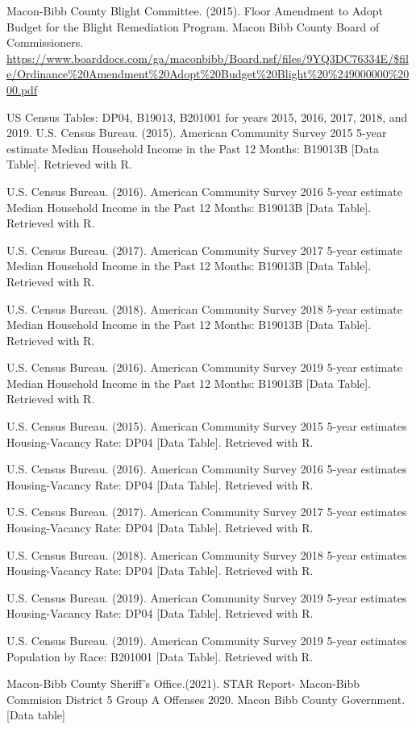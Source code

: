\documentclass[
]{article}
\begin{document}
Macon-Bibb County Blight Committee. (2015). Floor Amendment to Adopt
Budget for the Blight Remediation Program. Macon Bibb County Board of
Commissioners.
\url{https://www.boarddocs.com/ga/maconbibb/Board.nsf/files/9YQ3DC76334E/$file/Ordinance\%20Amendment\%20Adopt\%20Budget\%20Blight\%20\%249000000\%2000.pdf}

US Census Tables: DP04, B19013, B201001 for years 2015, 2016, 2017,
2018, and 2019. U.S. Census Bureau. (2015). American Community Survey
2015 5-year estimate Median Household Income in the Past 12 Months:
B19013B {[}Data Table{]}. Retrieved with R.

U.S. Census Bureau. (2016). American Community Survey 2016 5-year
estimate Median Household Income in the Past 12 Months: B19013B {[}Data
Table{]}. Retrieved with R.

U.S. Census Bureau. (2017). American Community Survey 2017 5-year
estimate Median Household Income in the Past 12 Months: B19013B {[}Data
Table{]}. Retrieved with R.

U.S. Census Bureau. (2018). American Community Survey 2018 5-year
estimate Median Household Income in the Past 12 Months: B19013B {[}Data
Table{]}. Retrieved with R.

U.S. Census Bureau. (2016). American Community Survey 2019 5-year
estimate Median Household Income in the Past 12 Months: B19013B {[}Data
Table{]}. Retrieved with R.

U.S. Census Bureau. (2015). American Community Survey 2015 5-year
estimates Housing-Vacancy Rate: DP04 {[}Data Table{]}. Retrieved with R.

U.S. Census Bureau. (2016). American Community Survey 2016 5-year
estimates Housing-Vacancy Rate: DP04 {[}Data Table{]}. Retrieved with R.

U.S. Census Bureau. (2017). American Community Survey 2017 5-year
estimates Housing-Vacancy Rate: DP04 {[}Data Table{]}. Retrieved with R.

U.S. Census Bureau. (2018). American Community Survey 2018 5-year
estimates Housing-Vacancy Rate: DP04 {[}Data Table{]}. Retrieved with R.

U.S. Census Bureau. (2019). American Community Survey 2019 5-year
estimates Housing-Vacancy Rate: DP04 {[}Data Table{]}. Retrieved with R.

U.S. Census Bureau. (2019). American Community Survey 2019 5-year
estimates Population by Race: B201001 {[}Data Table{]}. Retrieved with
R.

Macon-Bibb County Sheriff's Office.(2021). STAR Report- Macon-Bibb
Commision District 5 Group A Offenses 2020. Macon Bibb County
Government. {[}Data table{]}
\end{document}
